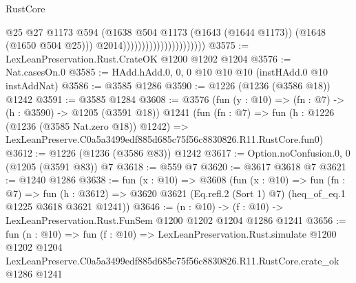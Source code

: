 \begin{lexlean}{RustCore}
\begin{coremodule}
                                                @25
                                                @27
                                                @1173
                                                @594
                                                (@1638
                                                  @504
                                                  @1173
                                                  (@1643 (@1644 @1173))
                                                  (@1648 (@1650 @504 @25)))
                                                @2014))))))))))))))))))))))
@3575 := LexLeanPreservation.Rust.CrateOK @1200 @1202 @1204
@3576 := Nat.casesOn.{0}
@3585 := HAdd.hAdd.{0, 0, 0} @10 @10 @10 (instHAdd.{0} @10 instAddNat)
@3586 := @3585 @1286
@3590 := @1226 (@1236 (@3586 @18)) @1242
@3591 := @3585 @1284
@3608 := @3576
    (fun (y : @10) => (fn : @7) -> (h : @3590) -> @1205 (@3591 @18))
    @1241
    (fun (fn : @7) =>
    fun (h : @1226 (@1236 (@3585 Nat.zero @18)) @1242) =>
    LexLeanPreserve.C0a5a3499edf885d685c75f56c8830826.R11.RustCore.fun0)
@3612 := @1226 (@1236 (@3586 @83)) @1242
@3617 := Option.noConfusion.{0, 0} (@1205 (@3591 @83)) @7
@3618 := @559 @7
@3620 := @3617 @3618 @7
@3621 := @1240 @1286
@3638 := fun (x : @10) =>
  @3608
    (fun (x : @10) =>
    fun (fn : @7) =>
    fun (h : @3612) =>
    @3620 @3621 (Eq.refl.{2} (Sort 1) @7) (heq_of_eq.{1} @1225 @3618 @3621 @1241))
@3646 := (n : @10) -> (f : @10) -> LexLeanPreservation.Rust.FunSem @1200 @1202 @1204 @1286 @1241
@3656 := fun (n : @10) =>
  fun (f : @10) =>
  LexLeanPreservation.Rust.simulate
    @1200
    @1202
    @1204
    LexLeanPreserve.C0a5a3499edf885d685c75f56c8830826.R11.RustCore.crate_ok
    @1286
    @1241
\end{coremodule}
\end{lexlean}
